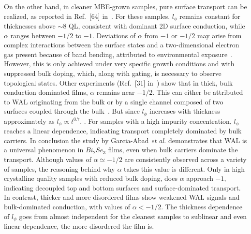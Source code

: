 \documentclass[twocolumn,10pt,a4paper]{article}
\begin{document}
On the other hand, in cleaner MBE-grown samples, pure surface transport can be realized, as reported in Ref.~[64] in~\cite{nano11051077}. For these samples, $l_\phi$ remains constant for thicknesses above $\sim$8 QL, consistent with dominant 2D surface conduction, while $\alpha$ ranges between $-1/2$ to $-1$. Deviations of $\alpha$ from $-1$ or $-1/2$ may arise from complex interactions between the surface states and a two-dimensional electron gas present because of band bending, attributed to environmental exposure~\cite{BRAHLEK201554}. However, this is only achieved under very specific growth conditions and with suppressed bulk doping, which, along with gating, is necessary to observe topological states. 
Other experiments (Ref.~[31] in~\cite{nano11051077}) show that in thick, bulk conduction dominated films, $\alpha$ remains near $-1/2$. This can either be attributed to WAL originating from the bulk or by a single channel composed of two surfaces coupled through the bulk~\cite{nano11051077}. But since $l_\phi$ increases with thickness approximately as $l_\phi \propto t^{0.7}$, . For samples with a high impurity concentration, $l_\phi$ reaches a linear dependence, indicating transport completely dominated by bulk carriers.
In conclusion the study by Garcia-Abad \textit{et al.} demonstrates that WAL is a universal phenomenon in $Bi_2Se_3$ films, even when bulk carriers dominate the transport. Although values of $\alpha \simeq -1/2$ are consistently observed across a variety of samples, the reasoning behind why $\alpha$ takes this value is different. Only in high crystalline quality samples with reduced bulk doping, does $\alpha$ approach $-1$, indicating decoupled top and bottom surfaces and surface-dominated transport. In contrast, thicker and more disordered films show weakened WAL signals and bulk-dominated conduction, with values of $\alpha < -1/2$. The thickness dependence of $l_\phi$ goes from almost independent for the cleanest samples to sublinear and even linear dependence, the more disordered the film is. 
\end{document}
